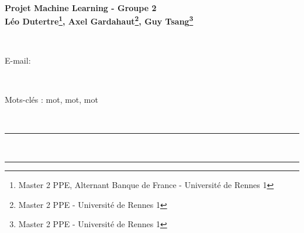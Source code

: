 \documentclass[french]{article}
\makeatletter
\def\vhrulefill#1{\leavevmode\leaders\hrule\@height#1\hfill \kern\z@}
\renewenvironment{abstract} %
 {\par\noindent\textbf{\abstractname}\ \ignorespaces\\}
 {\par\medskip}
\makeatother
\begin{document}
\noindent\begin{minipage}{\textwidth}

\ \\[20pt]

{\LARGE \bf Projet Machine Learning - Groupe 2} \\

{\large \bf Léo Dutertre\footnote{Master 2 PPE, Alternant Banque de France - Université de Rennes 1}, 
            Axel Gardahaut\footnote{Master 2 PPE - Université de Rennes 1}, 
            Guy Tsang\footnote{Master 2 PPE - Université de Rennes 1}}



\end{minipage}

\

\noindent E-mail: 

\null

\begin{abstract}
\lipsum[14]
\end{abstract}

\noindent Mots-clés : mot, mot, mot

\

\noindent \vhrulefill{1.5pt} ~ ~ \vhrulefill{1.5pt}
\end{document}
